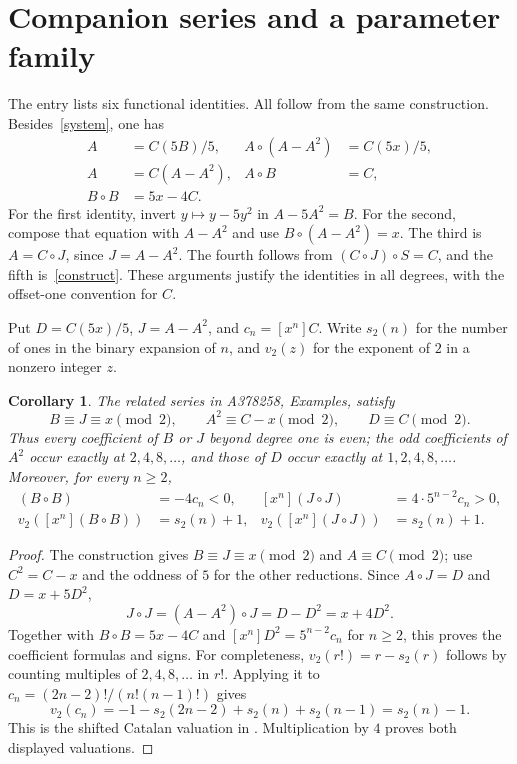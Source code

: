 \documentclass[11pt]{article}
\newtheorem{corollary}{Corollary}
\begin{document}
\section{Companion series and a parameter family}
The entry lists six functional identities. All follow from the same construction. Besides~\eqref{system}, one has
\begin{align*}
 A&=C(5B)/5,& A\circ(A-A^2)&=C(5x)/5,\\
 A&=C(A-A^2),& A\circ B&=C,\\
 B\circ B&=5x-4C.
\end{align*}
For the first identity, invert $y\mapsto y-5y^2$ in $A-5A^2=B$. For the second, compose that equation with $A-A^2$ and use $B\circ(A-A^2)=x$. The third is $A=C\circ J$, since $J=A-A^2$. The fourth follows from $(C\circ J)\circ S=C$, and the fifth is~\eqref{construct}. These arguments justify the identities in all degrees, with the offset-one convention for $C$.

Put $D=C(5x)/5$, $J=A-A^2$, and $c_n=[x^n]C$. Write $s_2(n)$ for
the number of ones in the binary expansion of $n$, and $v_2(z)$ for the
exponent of $2$ in a nonzero integer $z$.

\begin{corollary}\label{companions}
The related series in A378258, Examples, satisfy
\[
 B\equiv J\equiv x\pmod2,\qquad
 A^2\equiv C-x\pmod2,\qquad D\equiv C\pmod2.
\]
Thus every coefficient of $B$ or $J$ beyond degree one is even; the odd
coefficients of $A^2$ occur exactly at $2,4,8,\ldots$, and those of $D$
occur exactly at $1,2,4,8,\ldots$. Moreover, for every $n\geq2$,
\begin{align*}
 [x^n](B\circ B)&=-4c_n<0,&
 [x^n](J\circ J)&=4\cdot5^{n-2}c_n>0,\\
 v_2([x^n](B\circ B))&=s_2(n)+1,&
 v_2([x^n](J\circ J))&=s_2(n)+1.
\end{align*}
\end{corollary}
\begin{proof}
The construction gives $B\equiv J\equiv x\pmod2$ and $A\equiv C\pmod2$;
use $C^2=C-x$ and the oddness of $5$ for the other reductions.
Since $A\circ J=D$ and $D=x+5D^2$,
\[
 J\circ J=(A-A^2)\circ J=D-D^2=x+4D^2.
\]
Together with $B\circ B=5x-4C$ and
$[x^n]D^2=5^{n-2}c_n$ for $n\geq2$, this proves the coefficient formulas
and signs. For completeness, $v_2(r!)=r-s_2(r)$ follows by counting
multiples of $2,4,8,\ldots$ in $r!$. Applying it to
$c_n=(2n-2)!/(n!(n-1)!)$ gives
\[
 v_2(c_n)=-1-s_2(2n-2)+s_2(n)+s_2(n-1)=s_2(n)-1.
\]
This is the shifted Catalan valuation in \cite[Theorem 2.1]{deutsch-sagan}.
Multiplication by $4$ proves both displayed valuations.
\end{proof}
\end{document}
